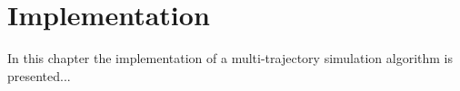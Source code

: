 
\chapter{Implementation} 
\label{ch:Implementation}
In this chapter the implementation of a multi-trajectory simulation algorithm is presented...